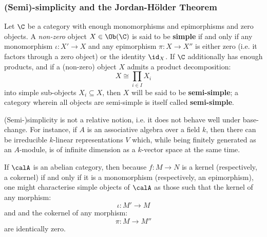         \subsubsection{(Semi)-simplicity and the Jordan-H\"older Theorem}
            \begin{definition} \label{def: (semi)_simple_objects}
                Let $\C$ be a category with enough monomorphisms and epimorphisms and zero objects. A \textit{non-zero} object $X \in \Ob(\C)$ is said to be \textbf{simple} if and only if any monomorphism $\iota: X' \to X$ and any epimorphism $\pi: X \to X''$ is either zero (i.e. it factors through a zero object) or the identity $\id_X$. If $\C$ additionally has enough products, and if a (non-zero) object $X$ admits a product decomposition:
                    $$X \cong \prod_{i \in I} X_i$$
                into simple sub-objects $X_i \subseteq X$, then $X$ will be said to be \textbf{semi-simple}; a category wherein all objects are semi-simple is itself called \textbf{semi-simple}.
            \end{definition}
            \begin{example}
                (Semi-)simplicity is not a relative notion, i.e. it does not behave well under base-change. For instance, if $A$ is an associative algebra over a field $k$, then there can be irreducible $k$-linear representations $V$ which, while being finitely generated as an $A$-module, is of infinite dimension as a $k$-vector space at the same time.
            \end{example}
            \begin{remark}
                If $\calA$ is an abelian category, then because $f: M \to N$ is a kernel (respectively, a cokernel) if and only if it is a monomorphism (respectively, an epimorphism), one might characterise simple objects of $\calA$ as those such that the kernel of any morphism:
                    $$\iota: M' \to M$$
                and and the cokernel of any morphism:
                    $$\pi: M \to M''$$
                are identically zero. 
            \end{remark}
